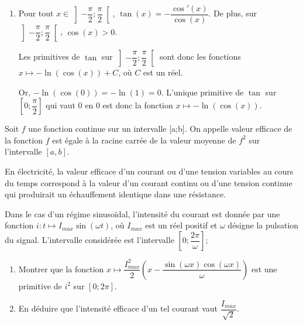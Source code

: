 \documentclass[11pt,fleqn, openany]{book} %
\begin{document}
\begin{solution}
\begin{enumerate}
\begin{center}
\begin{tikzpicture}[scale=1]
\end{tikzpicture}
\end{center}

\item Pour tout $x\in\left]-\dfrac{\pi}{2};\dfrac{\pi}{2}\right[$, $\tan(x)=-\dfrac{\cos'(x)}{\cos(x)}$. De plus, sur $\left]-\dfrac{\pi}{2};\dfrac{\pi}{2}\right[$, $\cos(x)>0$. 

Les primitives de $\tan$ sur $\left]-\dfrac{\pi}{2};\dfrac{\pi}{2}\right[$ sont donc les fonctions $x\mapsto -\ln(\cos(x)) +C$, où $C$ est un réel. 

Or, $-\ln(\cos(0))=-\ln(1)=0$. L'unique primitive de $\tan$ sur $\left[0;\dfrac{\pi}{2}\right]$ qui vaut 0 en 0 est donc la fonction $x\mapsto -\ln(\cos(x))$.
\end{enumerate}
\end{solution}




\begin{exercise}[subtitle={(Tension efficace)}]
Soit $f$ une fonction continue sur un intervalle [a;b]. On appelle valeur efficace de la fonction $f$ est égale à la racine carrée de la valeur moyenne de $f^2$ sur l'intervalle $[a,b]$.

En électricité, la valeur efficace d'un courant ou d'une tension variables au cours du temps correspond à la valeur d'un courant continu ou d'une tension continue qui produirait un échauffement identique dans une résistance.

Dans le cas d'un régime sinusoïdal, l'intensité du courant est donnée par une fonction $i : t \mapsto I_{max}\sin(\omega t)$, où $I_{max}$ est un réel positif et $\omega$ désigne la pulsation du signal. L'intervalle considérée est l'intervalle $\left[0;\dfrac{2\pi}{\omega}\right]$;

\begin{enumerate}
\item Montrer que la fonction $x\mapsto \dfrac{I_{max}^2}{2}\left(x-\dfrac{\sin(\omega x)\cos(\omega x)}{\omega}\right)$ est une primitive de $i^2$ sur $[0;2\pi]$.
\item En déduire que l'intensité efficace d'un tel courant vaut $\dfrac{I_{max}}{\sqrt{2}}$.
\end{enumerate}\newpage \end{exercise}
\end{document}
